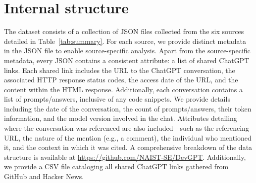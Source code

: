 \documentclass[10pt,conference]{IEEEtran}
\begin{document}
\section{Internal structure}

The dataset consists of a collection of JSON files collected from the six sources detailed in Table~\ref{tab:summary}. For each source, we provide distinct metadata in the JSON file to enable source-specific analysis. Apart from the source-specific metadata, every JSON contains a consistent attribute: a list of shared ChatGPT links. Each shared link includes the URL to the ChatGPT conversation, the associated HTTP response status codes, the access date of the URL, and the content within the HTML response. Additionally, each conversation contains a list of prompts/answers, inclusive of any code snippets. We provide details including the date of the conversation, the count of prompts/answers, their token information, and the model version involved in the chat. Attributes detailing where the conversation was referenced are also included---such as the referencing URL, the nature of the mention (e.g., a comment), the individual who mentioned it, and the context in which it was cited. A comprehensive breakdown of the data structure is available at \url{https://github.com/NAIST-SE/DevGPT}. Additionally, we provide a CSV file cataloging all shared ChatGPT links gathered from GitHub and Hacker News.
\end{document}
